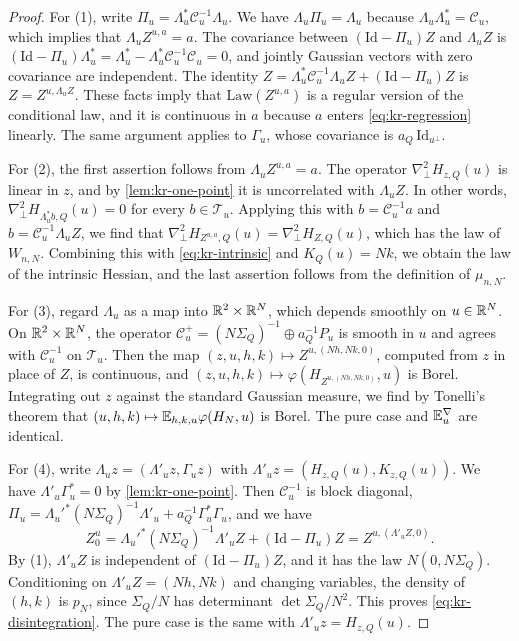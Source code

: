 \begin{proof}
For (1), write $\Pi_u=\Lambda_u^{*}\mathcal C_u^{-1}\Lambda_u$. We have $\Lambda_u\Pi_u=\Lambda_u$ because $\Lambda_u\Lambda_u^{*}=\mathcal C_u$, which implies that $\Lambda_uZ^{u,a}=a$. The covariance between $(\mathrm{Id}-\Pi_u)Z$ and $\Lambda_uZ$ is $(\mathrm{Id}-\Pi_u)\Lambda_u^{*}=\Lambda_u^{*}-\Lambda_u^{*}\mathcal C_u^{-1}\mathcal C_u=0$, and jointly Gaussian vectors with zero covariance are independent. The identity $Z=\Lambda_u^{*}\mathcal C_u^{-1}\Lambda_uZ+(\mathrm{Id}-\Pi_u)Z$ is $Z=Z^{u,\Lambda_uZ}$. These facts imply that $\mathrm{Law}(Z^{u,a})$ is a regular version of the conditional law, and it is continuous in $a$ because $a$ enters \eqref{eq:kr-regression} linearly. The same argument applies to $\Gamma_u$, whose covariance is $a_Q\,\mathrm{Id}_{u^\perp}$.

For (2), the first assertion follows from $\Lambda_uZ^{u,a}=a$. The operator $\nabla^2_\perp H_{z,Q}(u)$ is linear in $z$, and by \cref{lem:kr-one-point} it is uncorrelated with $\Lambda_uZ$. In other words, $\nabla^2_\perp H_{\Lambda_u^{*}b,Q}(u)=0$ for every $b\in \mathcal T_u$. Applying this with $b=\mathcal C_u^{-1}a$ and $b=\mathcal C_u^{-1}\Lambda_uZ$, we find that $\nabla^2_\perp H_{Z^{u,a},Q}(u)=\nabla^2_\perp H_{Z,Q}(u)$, which has the law of $W_{n,N}$. Combining this with \eqref{eq:kr-intrinsic} and $K_Q(u)=Nk$, we obtain the law of the intrinsic Hessian, and the last assertion follows from the definition of $\mu_{n,N}$.

For (3), regard $\Lambda_u$ as a map into $\mathbb R^2\times\mathbb R^N$, which depends smoothly on $u\in\mathbb R^N$. On $\mathbb R^2\times\mathbb R^N$, the operator $\mathcal C_u^{+}=(N\Sigma_Q)^{-1}\oplus a_Q^{-1}P_u$ is smooth in $u$ and agrees with $\mathcal C_u^{-1}$ on $\mathcal T_u$. Then the map $(z,u,h,k)\mapsto Z^{u,(Nh,Nk,0)}$, computed from $z$ in place of $Z$, is continuous, and $(z,u,h,k)\mapsto\varphi(H_{Z^{u,(Nh,Nk,0)}},u)$ is Borel. Integrating out $z$ against the standard Gaussian measure, we find by Tonelli's theorem that $(u,h,k)\mapsto\mathbb E_{h,k,u}\varphi(H_N,u)$ is Borel. The pure case and $\mathbb E^\nabla_u$ are identical.

For (4), write $\Lambda_uz=(\Lambda'_uz,\Gamma_uz)$ with $\Lambda'_uz=(H_{z,Q}(u),K_{z,Q}(u))$. We have $\Lambda'_u\Gamma_u^{*}=0$ by \cref{lem:kr-one-point}. Then $\mathcal C_u^{-1}$ is block diagonal, $\Pi_u=\Lambda_u'^{*}(N\Sigma_Q)^{-1}\Lambda'_u+a_Q^{-1}\Gamma_u^{*}\Gamma_u$, and we have
\[
Z^u_0=\Lambda_u'^{*}(N\Sigma_Q)^{-1}\Lambda'_uZ+(\mathrm{Id}-\Pi_u)Z=Z^{u,(\Lambda'_uZ,0)}.
\]
By (1), $\Lambda'_uZ$ is independent of $(\mathrm{Id}-\Pi_u)Z$, and it has the law $N(0,N\Sigma_Q)$. Conditioning on $\Lambda'_uZ=(Nh,Nk)$ and changing variables, the density of $(h,k)$ is $p_N$, since $\Sigma_Q/N$ has determinant $\det\Sigma_Q/N^2$. This proves \eqref{eq:kr-disintegration}. The pure case is the same with $\Lambda'_uz=H_{z,Q}(u)$.
\end{proof}

